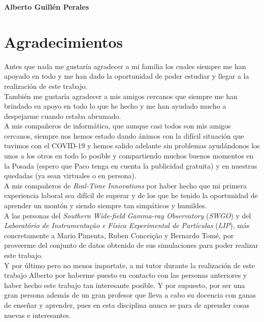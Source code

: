\noindent \textbf{Alberto Guillén Perales}

\chapter*{Agradecimientos}
\thispagestyle{empty}

       \vspace{1cm}


Antes que nada me gustaría agradecer a mi familia los cuales siempre me han apoyado en todo y me han dado la oportunidad de poder estudiar y llegar a la realización de este trabajo.\\

También me gustaría agradecer a mis amigos cercanos que siempre me han brindado su apoyo en todo lo que he hecho y me han ayudado mucho a despejarme cuando estaba abrumado.\\

A mis compañeros de informática, que aunque casi todos son mis amigos cercanos, siempre nos hemos estado dando ánimos con la difícil situación que tuvimos con el COVID-19 y hemos salido adelante sin problemas ayudándonos los unos a los otros en todo lo posible y compartiendo muchos buenos momentos en la Posada (espero que Paco tenga en cuenta la publicidad gratuita) y en nuestras quedadas (ya sean virtuales o en persona).\\

A mis compañeros de \textit{Real-Time Innovations} por haber hecho que mi primera experiencia laboral sea difícil de superar y de los que he tenido la oportunidad de aprender un montón y siendo siempre tan simpáticos y humildes.\\

A las personas del \textit{Southern Wide-field Gamma-ray Observatory} (\textit{SWGO}) y del \textit{Laboratório de Instrumentação e Física Experimental de Partículas} (\textit{LIP}), más concretamente a Mario Pimenta, Ruben Conceição y Bernardo Tomé, por proveerme del conjunto de datos obtenido de sus simulaciones para poder realizar este trabajo.\\

Y por último pero no menos importate, a mi tutor durante la realización de este trabajo Alberto por haberme puesto en contacto con las personas anteriores y haber hecho este trabajo tan interesante posible. Y por supuesto, por ser una gran persona además de un gran profesor que lleva a cabo su docencia con ganas de enseñar y aprender, pues en esta disciplina nunca se para de aprender cosas nuevas e interesantes.
